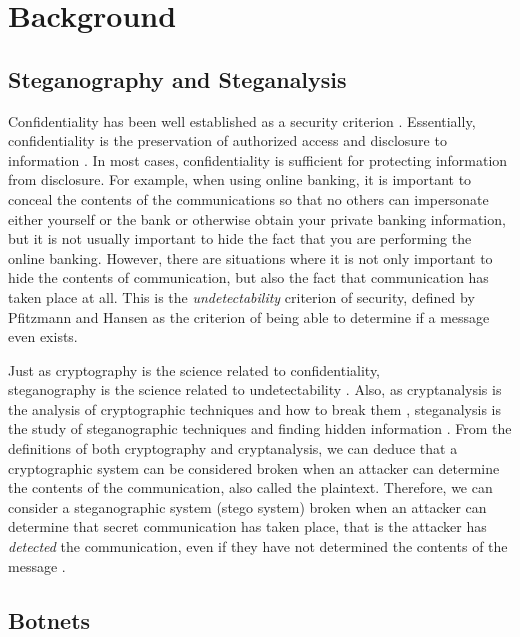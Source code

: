 \section{Background}
\label{cha:lit-review}

\subsection{Steganography and Steganalysis}
\label{sec:lit-review:stego}

Confidentiality has been well established as a security
criterion \cite{gollmann}.  Essentially, confidentiality is the preservation of
authorized access and disclosure to information \cite{fips-199}.  In most
cases, confidentiality is sufficient for protecting information from disclosure.
For example, when using online banking, it is important to conceal the contents of the
communications so that no others can impersonate either yourself or the bank or
otherwise obtain your private banking information, but it is not usually
important to hide the fact that you are performing the online banking.
However, there are situations where it is not only important to hide the
contents of communication, but also the fact that communication has taken place
at all.  This is the \emph{undetectability} criterion of security, defined by
Pfitzmann and Hansen \cite{anon_terminology} as the criterion of being able to
determine if a message even exists.

Just as cryptography is the science related to confidentiality, \\steganography is
the science related to undetectability \cite{steganalysis}.  Also, as
cryptanalysis is the analysis of cryptographic techniques and how to break
them \cite{comp-sec}, steganalysis is the study of steganographic techniques
and finding hidden information \cite{steganalysis}.  From the definitions of
both cryptography and cryptanalysis, we can deduce that a cryptographic system can be
considered broken when an attacker can determine the contents of the
communication, also called the plaintext.  Therefore, we can consider a
steganographic system (stego system) broken when an attacker can determine that
secret communication has taken place, that is the attacker has \emph{detected}
the communication, even if they have not determined the contents of the
message \cite{steganalysis}.

\subsection{Botnets}
\label{sec:lit-review:botnets}

